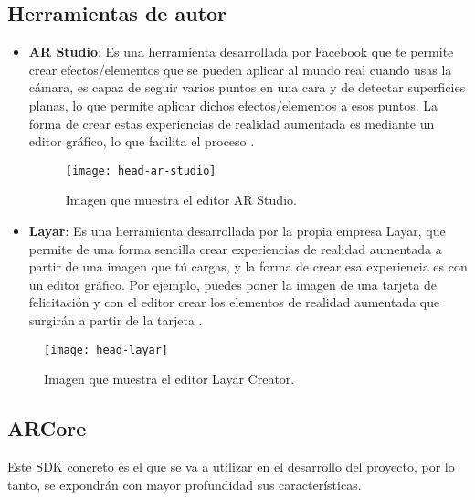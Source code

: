 \subsection{Herramientas de autor}
\begin{itemize}
  \item \textbf{AR Studio}: Es una herramienta desarrollada por Facebook que te permite crear efectos/elementos que se pueden aplicar al mundo real cuando usas la cámara, es capaz de seguir varios puntos en una cara y de detectar superficies planas, lo que permite aplicar dichos efectos/elementos a esos puntos. La forma de crear estas experiencias de realidad aumentada es mediante un editor gráfico, lo que facilita el proceso \cite{ar-studio}.

  \begin{figure}[h]
    \centering
    \texttt{[image: head-ar-studio]}
    \caption{Imagen que muestra el editor AR Studio.\protect\footnotemark}
    \label{figura-arstudio}
  \end{figure}



  \item  \textbf{Layar}: Es una herramienta desarrollada por la propia empresa Layar, que permite de una forma sencilla crear experiencias de realidad aumentada a partir de una imagen que tú cargas, y la forma de crear esa experiencia es con un editor gráfico. Por ejemplo, puedes poner la imagen de una tarjeta de felicitación y con el editor crear los elementos de realidad aumentada que surgirán a partir de la tarjeta \cite{layar}.
\end{itemize}

\begin{figure}[h]
  \centering
  \texttt{[image: head-layar]}
  \caption{Imagen que muestra el editor Layar Creator.\protect\footnotemark}
  \label{figura-layar}
\end{figure}


\subsection{ARCore}
Este SDK concreto es el que se va a utilizar en el desarrollo del proyecto, por lo tanto, se expondrán con mayor profundidad sus características.\\

